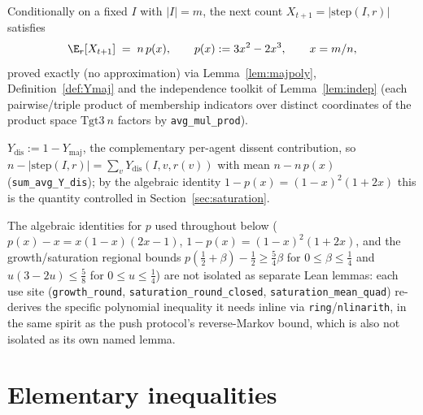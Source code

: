 \begin{lemma}\label{lem:drift}
  \leanok
  Conditionally on a fixed $I$ with $|I|=m$, the next count
  $X_{t+1} = |\mathrm{step}(I,r)|$ satisfies
  \[
    \E_r[X_{t+1}] \;=\; n\,p(x), \qquad p(x) := 3x^2-2x^3, \qquad x = m/n,
  \]
  proved exactly (no approximation) via Lemma~\ref{lem:majpoly},
  Definition~\ref{def:Ymaj} and the independence toolkit of
  Lemma~\ref{lem:indep} (each pairwise/triple product of membership
  indicators over distinct coordinates of the product space
  $\mathrm{Tgt3}\ n$ factors by \texttt{avg\_mul\_prod}).
\end{lemma}

\begin{definition}\label{def:Ydis}
  \leanok
  $Y_{\mathrm{dis}} := 1 - Y_{\mathrm{maj}}$, the complementary per-agent
  dissent contribution, so $n - |\mathrm{step}(I,r)| = \sum_v
  Y_{\mathrm{dis}}(I,v,r(v))$ with mean $n - n\,p(x)$
  (\texttt{sum\_avg\_Y\_dis}); by the algebraic identity
  $1-p(x) = (1-x)^2(1+2x)$ this is the quantity controlled in
  Section~\ref{sec:saturation}.
\end{definition}

\begin{remark}
  The algebraic identities for $p$ used throughout below ($p(x)-x =
  x(1-x)(2x-1)$, $1-p(x) = (1-x)^2(1+2x)$, and the growth/saturation
  regional bounds $p(\tfrac12+\beta)-\tfrac12 \ge \tfrac54\beta$ for
  $0\le\beta\le\tfrac14$ and $u(3-2u)\le\tfrac58$ for $0\le u\le\tfrac14$)
  are not isolated as separate Lean lemmas: each use site
  (\texttt{growth\_round}, \texttt{saturation\_round\_closed},
  \texttt{saturation\_mean\_quad}) re-derives the specific polynomial
  inequality it needs inline via \texttt{ring}/\texttt{nlinarith}, in the
  same spirit as the push protocol's reverse-Markov bound, which is also
  not isolated as its own named lemma.
\end{remark}

\section{Elementary inequalities}\label{sec:ineq}

